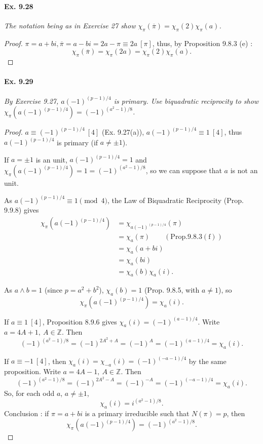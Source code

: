 \documentclass[11pt,a4paper]{article}
\newcommand{\Z}{\mathbb{Z}}
\begin{document}
\paragraph{Ex. 9.28}

{\it The notation being as in Exercise 27 show $\chi_\pi(\overline{\pi}) = \chi_\pi(2) \chi_\pi(a)$.
}

\begin{proof}
$\pi = a+bi,\overline{\pi} = a-bi = 2a-\pi \equiv 2a \ [\pi]$, thus, by Proposition 9.8.3 (e) :
 $$\chi_\pi(\overline{\pi}) = \chi_\pi(2a) = \chi_\pi(2) \chi_\pi(a).$$
\end{proof}

\paragraph{Ex. 9.29} 

{\it By Exercise 9.27, $a(-1)^{(p-1)/4}$ is primary. Use biquadratic reciprocity to show $\chi_\pi(a(-1)^{(p-1)/4}) = (-1)^{(a^2-1)/8}$.
}

\begin{proof}
$a \equiv (-1)^{(p-1)/4}\ [4]$ (Ex. 9.27(a)), $a  (-1)^{(p-1)/4} \equiv 1\  [4]$, thus $a  (-1)^{(p-1)/4}$ is primary (if $a \neq \pm 1$).

If $a = \pm 1$ is an unit, $a  (-1)^{(p-1)/4} = 1$ and $\chi_\pi(a(-1)^{(p-1)/4}) = 1 = (-1)^{(a^2-1)/8}$, so we can suppose that $a$ is not an unit.

As $a  (-1)^{(p-1)/4} \equiv 1 \pmod 4$, the Law of Biquadratic Reciprocity (Prop. 9.9.8) gives
\begin{align*}
\chi_\pi(a(-1)^{(p-1)/4}) &= \chi_{a(-1)^{(p-1)/4}}(\pi) \\
&= \chi_a(\pi) \qquad (\mathrm{Prop. 9.8.3(f)})\\
&=\chi_a(a+bi)\\
&=\chi_a(bi)\\
&=\chi_a(b) \chi_a(i).
\end{align*}

As $a \wedge b=1$ (since $p = a^2+b^2$), $\chi_a(b) = 1$ (Prop. 9.8.5, with $a\neq 1$), so
$$\chi_\pi(a(-1)^{(p-1)/4}) =  \chi_a(i).$$
 
 If $a\equiv 1 \ [4]$, Proposition 8.9.6 gives $\chi_a(i) = (-1)^{(a-1)/4}$. Write $a = 4A + 1,\ A\in \Z$. Then 
 $$(-1)^{(a^2-1)/8} = (-1)^{2A^2+A} = (-1)^A = (-1)^{(a-1)/4} = \chi_a(i).$$
 
 If $a \equiv -1 \ [4]$, then $\chi_a(i) = \chi_{-a}(i) = (-1)^{(-a-1)/4}$ by the same proposition. Write $a = 4A-1,\ A \in \Z$. Then
 $$(-1)^{(a^2-1)/8} = (-1)^{2A^2 - A} =(-1)^{-A} = (-1)^{(-a-1)/4} = \chi_a(i).$$
 So, for each odd $a$, $a \ne \pm 1$, $$\chi_a(i) = i^{(a^2-1)/8}.$$
 Conclusion : if $\pi = a + bi$ is a primary irreducible such that $N(\pi) = p$, then
  $$\chi_\pi(a (-1)^{(p-1)/4}) =  (-1)^{(a^2-1)/8}.$$
\end{proof}
\end{document}

